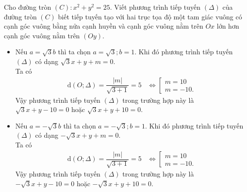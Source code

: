 \begin{bt}%
	Cho đường tròn $(C):x^2+y^2=25$. Viết phương trình tiếp tuyến $(\Delta)$ của đường tròn $(C)$ biết tiếp tuyến tạo với hai trục tọa độ một tam giác vuông có cạnh góc vuông bằng nửa cạnh huyền và cạnh góc vuông nằm trên $Ox$ lớn hơn cạnh góc vuông nằm trên $(Oy)$.
	\begin{itemize}
		\item Nếu $a=\sqrt{3}b$ thì ta chọn $a=\sqrt{3};b=1$. Khi đó phương trình tiếp tuyến $(\Delta)$ có dạng $\sqrt{3}x+y+m=0$.
		\\ Ta có \begin{align*}
		\mathrm{d}(O;\Delta)=\dfrac{|m|}{\sqrt{3+1}}=5 &\Leftrightarrow \left[\begin{array}{ll}
		m=10 \\ m=-10.
		\end{array}\right.
		\end{align*}
		Vậy phương trình tiếp tuyến $(\Delta)$ trong trường hợp này là $\sqrt{3}x+y-10=0$ hoặc $\sqrt{3}x+y+10=0$.
		\item Nếu $a=-\sqrt{3}b$ thì ta chọn $a=-\sqrt{3};b=1$. Khi đó phương trình tiếp tuyến $(\Delta)$ có dạng $-\sqrt{3}x+y+m=0$.
		\\ Ta có \begin{align*}
		\mathrm{d}(O;\Delta)=\dfrac{|m|}{\sqrt{3+1}}=5 &\Leftrightarrow \left[\begin{array}{ll}
		m=10 \\ m=-10.
		\end{array}\right.
		\end{align*}
		Vậy phương trình tiếp tuyến $(\Delta)$ trong trường hợp này là $-\sqrt{3}x+y-10=0$ hoặc $-\sqrt{3}x+y+10=0$.
	\end{itemize}
\end{bt}

